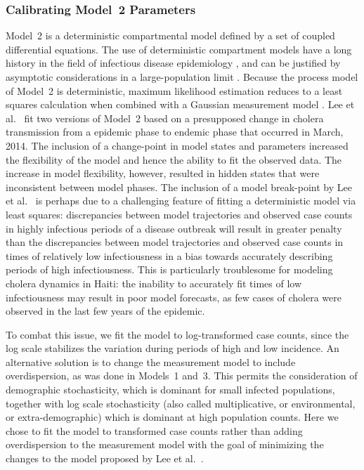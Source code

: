 \documentclass[10pt,letterpaper]{article}\usepackage[]{graphicx}\usepackage[table]{xcolor}
\begin{document}
\subsubsection*{Calibrating Model~2 Parameters}\label{sec:fit2}

Model~2 is a deterministic compartmental model defined by a set of coupled differential equations.
The use of deterministic compartment models have a long history in the field of infectious disease epidemiology \cite{kermack1927,brauer2017,giordano20},
and can be justified by asymptotic considerations in a large-population limit \cite{dadlani2020,ndii17}.
Because the process model of Model~2 is deterministic, maximum likelihood estimation reduces to a least squares calculation when combined with a Gaussian measurement model  .
Lee et al.~\cite{lee20} fit two versions of Model~2 based on a presupposed change in cholera transmission from a epidemic phase to endemic phase that occurred in March, 2014.
The inclusion of a change-point in model states and parameters increased the flexibility of the model and hence the ability to fit the observed data.
The increase in model flexibility, however, resulted in hidden states that were inconsistent between model phases.
The inclusion of a model break-point by Lee et al.~\cite{lee20} is perhaps due to a challenging feature of fitting a deterministic model via least squares: discrepancies between model trajectories and observed case counts in highly infectious periods of a disease outbreak will result in greater penalty than the discrepancies between model trajectories and observed case counts in times of relatively low infectiousness  in a bias towards accurately describing periods of high infectiousness.
This   is particularly troublesome for modeling cholera dynamics in Haiti: the inability to accurately fit times of low infectiousness may result in poor model forecasts, as few cases of cholera were observed in the last few years of the epidemic.

To combat this issue, we fit the model to log-transformed case counts, since the log scale stabilizes the variation during periods of high and low incidence.
An alternative solution is to change the measurement model to include overdispersion, as was done in Models~1 and~3.
This permits the consideration of demographic stochasticity, which is dominant for small infected populations, together with log scale stochasticity (also called multiplicative, or environmental, or extra-demographic) which is dominant at high population counts.
Here we chose to fit the model to transformed case counts rather than adding overdispersion to the measurement model with the goal of minimizing the changes to the model proposed by Lee et al.~\cite{lee20}.
\end{document}

